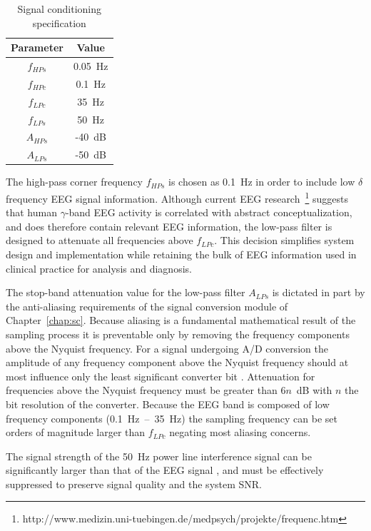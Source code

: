 \begin{table}
\begin{center}	
	\begin{tabular}[htpb]{|c|c|} \hline
	Parameter & Value \\ \hline
	$f_{HPs}$ & 0.05~Hz \\
	$f_{HPc}$ & 0.1~Hz \\ 
	$f_{LPc}$ & 35~Hz \\
	$f_{LPs}$ & 50~Hz \\
	$A_{HPs}$ & -40~dB \\
	$A_{LPs}$ & -50~dB \\
	\hline
	\end{tabular}
	\caption{Signal conditioning specification}
	\label{table:sc-specs}
\end{center}	
\end{table}

The high-pass corner frequency $f_{HPs}$ is chosen as 0.1~Hz in order
to include low $\delta$ frequency EEG signal information. Although
current EEG
research~\footnote{http://www.medizin.uni-tuebingen.de/medpsych/projekte/frequenc.htm}
suggests that human $\gamma$-band EEG activity is correlated with
abstract conceptualization, and does therefore contain relevant EEG
information, the low-pass filter is designed to attenuate all
frequencies above $f_{LPc}$. This decision simplifies system design
and implementation while retaining the bulk of EEG information used in
clinical practice for analysis and diagnosis.

The stop-band attenuation value for the low-pass filter $A_{LPs}$ is
dictated in part by the anti-aliasing requirements of the signal
conversion module of Chapter~\ref{chap:sc}. Because aliasing is a
fundamental mathematical result of the sampling process it is
preventable only by removing the frequency components above the
Nyquist frequency. For a signal undergoing A/D conversion the
amplitude of any frequency component above the Nyquist frequency
should at most influence only the least significant converter bit
\cite[p7]{design-guide}. Attenuation for frequencies above the Nyquist
frequency must be greater than 6$n$~dB with $n$ the bit resolution of
the converter. Because the EEG band is composed of low frequency
components (0.1~Hz~--~35~Hz) the sampling frequency can be set orders
of magnitude larger than $f_{LPc}$ negating most aliasing concerns.

The signal strength of the 50~Hz power line interference signal can be
significantly larger than that of the EEG signal
\cite{noise-rejection} \cite{fluorescent-interference}
\cite{fluorescent-interference2}, and must be effectively suppressed
to preserve signal quality and the system SNR.

